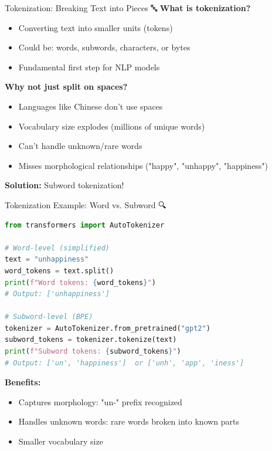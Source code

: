\documentclass[aspectratio=169]{beamer}
\begin{document}
\begin{frame}[shrink=10]{Tokenization: Breaking Text into Pieces 🔤}
    \textbf{What is tokenization?}
    \begin{itemize}\setlength{\itemsep}{0pt}
        \item Converting text into smaller units (tokens)
        \item Could be: words, subwords, characters, or bytes
        \item Fundamental first step for NLP models
    \end{itemize}

    \vspace{0.5em}
    \textbf{Why not just split on spaces?}
    \begin{itemize}\setlength{\itemsep}{0pt}
        \item Languages like Chinese don't use spaces
        \item Vocabulary size explodes (millions of unique words)
        \item Can't handle unknown/rare words
        \item Misses morphological relationships ("happy", "unhappy", "happiness")
    \end{itemize}

    \vspace{0.5em}
    \textbf{Solution:} Subword tokenization! 🎯
\end{frame}

\begin{frame}[fragile]{Tokenization Example: Word vs. Subword 🔍}
    \begin{lstlisting}[language=Python]
from transformers import AutoTokenizer

# Word-level (simplified)
text = "unhappiness"
word_tokens = text.split()
print(f"Word tokens: {word_tokens}")
# Output: ['unhappiness']

# Subword-level (BPE)
tokenizer = AutoTokenizer.from_pretrained("gpt2")
subword_tokens = tokenizer.tokenize(text)
print(f"Subword tokens: {subword_tokens}")
# Output: ['un', 'happiness']  or ['unh', 'app', 'iness']
    \end{lstlisting}

    \vspace{0.5em}
    \textbf{Benefits:}
    \begin{itemize}\setlength{\itemsep}{0pt}
        \item Captures morphology: "un-" prefix recognized
        \item Handles unknown words: rare words broken into known parts
        \item Smaller vocabulary size
    \end{itemize}
\end{frame}
\end{document}
